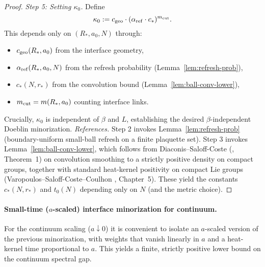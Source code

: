 \documentclass[11pt]{amsart}
\theoremstyle{plain}
\theoremstyle{definition}
\theoremstyle{remark}
\begin{document}
\begin{proof}
\emph{Step 5: Setting $\kappa_0$.} Define
\[
  \kappa_0 := c_{\rm geo} \cdot (\alpha_{\rm ref} \cdot c_*)^{m_{\rm cut}}.
\]
This depends only on $(R_*,a_0,N)$ through:
\begin{itemize}
  \item $c_{\rm geo}(R_*,a_0)$ from the interface geometry,
  \item $\alpha_{\rm ref}(R_*,a_0,N)$ from the refresh probability (Lemma~\ref{lem:refresh-prob}),
  \item $c_*(N,r_*)$ from the convolution bound (Lemma~\ref{lem:ball-conv-lower}),
  \item $m_{\rm cut} = m(R_*,a_0)$ counting interface links.
\end{itemize}
Crucially, $\kappa_0$ is independent of $\beta$ and $L$, establishing the desired $\beta$-independent Doeblin minorization.
\smallskip
\noindent\emph{References.} Step 2 invokes Lemma~\ref{lem:refresh-prob} (boundary-uniform small-ball refresh on a finite plaquette set). Step 3 invokes Lemma~\ref{lem:ball-conv-lower}, which follows from Diaconis--Saloff-Coste (\cite{DiaconisSaloffCoste2004}, Theorem~1) on convolution smoothing to a strictly positive density on compact groups, together with standard heat-kernel positivity on compact Lie groups (Varopoulos--Saloff-Coste--Coulhon \cite{VaropoulosSaloffCosteCoulhon1992}, Chapter~5). These yield the constants $c_*(N,r_*)$ and $t_0(N)$ depending only on $N$ (and the metric choice).\par
\end{proof}

\paragraph{Small-time (\boldmath$a$-scaled) interface minorization for continuum.}
For the continuum scaling ($a\downarrow 0$) it is convenient to isolate an $a$-scaled version of the previous minorization, with weights that vanish linearly in $a$ and a heat-kernel time proportional to $a$. This yields a finite, strictly positive lower bound on the continuum spectral gap.
\end{document}
